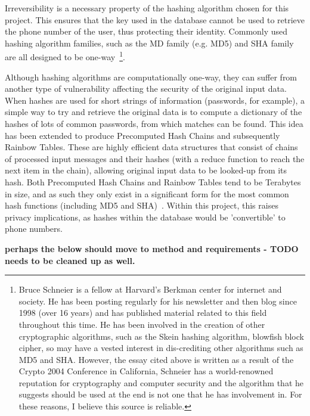 \documentclass{article}
\begin{document}
Irreversibility is a necessary property of the hashing algorithm chosen for this project.  This ensures that the key used in the database cannot be used to retrieve the phone number of the user, thus protecting their identity.  Commonly used hashing algorithm families, such as the MD family (e.g. MD5) and SHA family are all designed to be one-way~\cite{schneierCryptanalysisMD5SHA}\footnote{Bruce Schneier is a fellow at Harvard's Berkman center for internet and society.  He has been posting regularly for his newsletter and then blog since 1998 (over 16 years) and has published material related to this field throughout this time.  He has been involved in the creation of other cryptographic algorithms, such as the Skein hashing algorithm, blowfish block cipher, so may have a vested interest in dis-crediting other algorithms such as MD5 and SHA.  However, the essay cited above is written as a result of the Crypto 2004 Conference in California, Schneier has a world-renowned reputation for cryptography and computer security and the algorithm that he suggests should be used at the end is not one that he has involvement in.  For these reasons, I believe this source is reliable.}.  

Although hashing algorithms are computationally one-way, they can suffer from another type of vulnerability affecting the security of the original input data.  When hashes are used for short strings of information (passwords, for example), a simple way to try and retrieve the original data is to compute a dictionary of the hashes of lots of common passwords, from which matches can be found.  This idea has been extended to produce Precomputed Hash Chains and subsequently Rainbow Tables.  These are highly efficient data structures that consist of chains of processed input messages and their hashes (with a reduce function to reach the next item in the chain), allowing original input data to be looked-up from its hash.  Both Precomputed Hash Chains and Rainbow Tables tend to be Terabytes in size, and as such they only exist in a significant form for the most common hash functions (including MD5 and SHA)~\cite{Teat:2011:SCH:2016039.2016072}.  Within this project, this raises privacy implications, as hashes within the database would be 'convertible' to phone numbers.  

{\bf perhaps the below should move to method and requirements - TODO needs to be cleaned up as well.}
\end{document}
